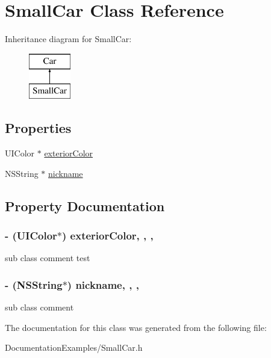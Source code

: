\hypertarget{interface_small_car}{}\section{Small\+Car Class Reference}
\label{interface_small_car}
Inheritance diagram for Small\+Car\+:\begin{figure}[H]
\begin{center}
\leavevmode
\includegraphics[height=2.000000cm]{interface_small_car}
\end{center}
\end{figure}
\subsection*{Properties}
\begin{DoxyCompactItemize}
\item 
U\+I\+Color $\ast$ \hyperlink{interface_small_car_a286abaea6871cde85bacc2e47fc31919}{exterior\+Color}
\item 
N\+S\+String $\ast$ \hyperlink{interface_small_car_ad1033f82517211f319f7b32ca0008f9a}{nickname}
\end{DoxyCompactItemize}


\subsection{Property Documentation}
\hypertarget{interface_small_car_a286abaea6871cde85bacc2e47fc31919}{}
\subsubsection[{exterior\+Color}]{\setlength{\rightskip}{0pt plus 5cm}-\/ (U\+I\+Color$\ast$) exterior\+Color\hspace{0.3cm}{\ttfamily [read]}, {\ttfamily [write]}, {\ttfamily [nonatomic]}, {\ttfamily [assign]}}\label{interface_small_car_a286abaea6871cde85bacc2e47fc31919}
sub class comment test \hypertarget{interface_small_car_ad1033f82517211f319f7b32ca0008f9a}{}
\subsubsection[{nickname}]{\setlength{\rightskip}{0pt plus 5cm}-\/ (N\+S\+String$\ast$) nickname\hspace{0.3cm}{\ttfamily [read]}, {\ttfamily [write]}, {\ttfamily [nonatomic]}, {\ttfamily [assign]}}\label{interface_small_car_ad1033f82517211f319f7b32ca0008f9a}
sub class comment 

The documentation for this class was generated from the following file\+:\begin{DoxyCompactItemize}
\item 
Documentation\+Examples/Small\+Car.\+h\end{DoxyCompactItemize}
